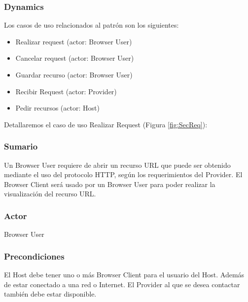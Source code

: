 \documentclass{sig-alternate-05-2015}
\begin{document}
    \subsubsection*{Dynamics}
    Los casos de uso relacionados al patrón son los siguientes:
    \begin{itemize}
      \item Realizar request (actor: Browser User)
      \item Cancelar request (actor: Browser User)
      \item Guardar recurso (actor: Browser User)
      \item Recibir Request (actor: Provider)
      \item Pedir recursos (actor: Host)
    \end{itemize}
    Detallaremos el caso de uso Realizar Request (Figura \ref{fig:SecReq}):
    \subsubsection*{Sumario} Un Browser User requiere de abrir un recurso URL que puede ser obtenido mediante el uso del protocolo HTTP, según los requerimientos del Provider. El Browser Client será usado por un Browser User para poder realizar la visualización del recurso URL.
    \subsubsection*{Actor} Browser User
    \subsubsection*{Precondiciones} El Host debe tener uno o más Browser Client para el usuario del Host. Además de estar conectado a una red o Internet. El Provider al que se desea contactar también debe estar disponible.
\end{document}
